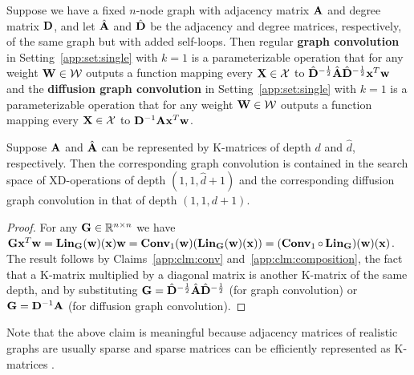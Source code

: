 \begin{Def}
	Suppose we have a fixed $n$-node graph with adjacency matrix $\mathbf{A}$ and degree matrix $\mathbf{D}$, and let $\hat{\mathbf{A}}$ and $\hat{\mathbf{D}}$ be the adjacency and degree matrices, respectively, of the same graph but with added self-loops.
	Then regular {\bf graph convolution} \citep{kipf2017gcn} in Setting~\ref{app:set:single} with $k=1$ is a parameterizable operation that for any weight $\mathbf{W}\in\mathcal W$ outputs a function mapping every $\mathbf{X}\in\mathcal X$ to $\hat{\mathbf{D}}^{-\frac12}\hat{\mathbf{A}}\hat{\mathbf{D}}^{-\frac12}\mathbf{x}^T\mathbf{w}$ and the {\bf diffusion graph convolution} \citep{li2018dcrnn} in Setting~\ref{app:set:single} with $k=1$ is a parameterizable operation that for any weight $\mathbf{W}\in\mathcal W$ outputs a function mapping every $\mathbf{X}\in\mathcal X$ to $\mathbf{D}^{-1}\mathbf{A}\mathbf{x}^T\mathbf{w}$.
\end{Def}
\begin{Clm}
	Suppose $\mathbf{A}$ and $\hat{\mathbf{A}}$ can be represented by K-matrices of depth $d$ and $\hat d$, respectively.
	Then the corresponding graph convolution is contained in the search space of XD-operations of depth $(1,1,\hat d+1)$ and the corresponding diffusion graph convolution in that of depth $(1,1,d+1)$.
\end{Clm}
\begin{proof}
	For any $\mathbf{G}\in\mathbb R^{n\times n}$ we have  $\mathbf{G}\mathbf{x}^T\mathbf{w}=\operatorname{\operatorname{\bf Lin}}_{\mathbf{G}}(\mathbf{w})(\mathbf{x})\mathbf{w}=\operatorname{\operatorname{\bf Conv}}_1(\mathbf{w})(\operatorname{\operatorname{\bf Lin}}_{\mathbf{G}}(\mathbf{w})(\mathbf{x}))=(\operatorname{\operatorname{\bf Conv}}_1\circ\operatorname{\operatorname{\bf Lin}}_{\mathbf{G}})(\mathbf{w})(\mathbf{x})$.
	The result follows by Claims~\ref{app:clm:conv} and~\ref{app:clm:composition}, the fact that a K-matrix multiplied by a diagonal matrix is another K-matrix of the same depth, and by substituting $\mathbf{G}=\hat{\mathbf{D}}^{-\frac12}\hat{\mathbf{A}}\hat{\mathbf{D}}^{-\frac12}$ (for graph convolution) or $\mathbf{G}=\mathbf{D}^{-1}\mathbf{A}$ (for diffusion graph convolution).
\end{proof}
\begin{Rem}
	Note that the above claim is meaningful because adjacency matrices of realistic graphs are usually sparse and sparse matrices can be efficiently represented as K-matrices \citep{dao2020kaleidoscope}.
\end{Rem}


